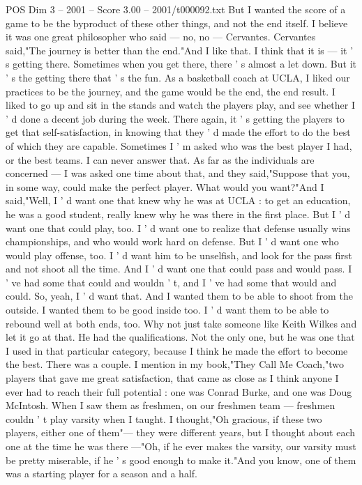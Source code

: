 \begin{textsample}{POS Dim 3 – 2001 – Score 3.00 – 2001/t000092.txt}
But I wanted the score of a game to be the byproduct of these other things, and not the end itself.
I believe it was one great philosopher who said — no, no — Cervantes.
Cervantes said,"The journey is better than the end."And I like that.
I think that it is — it ' s getting there.
Sometimes when you get there, there ' s almost a let down.
But it ' s the getting there that ' s the fun.
As a basketball coach at UCLA, I liked our practices to be the journey, and the game would be the end, the end result.
I liked to go up and sit in the stands and watch the players play, and see whether I ' d done a decent job during the week.
There again, it ' s getting the players to get that self-satisfaction, in knowing that they ' d made the effort to do the best of which they are capable.
Sometimes I ' m asked who was the best player I had, or the best teams.
I can never answer that.
As far as the individuals are concerned — I was asked one time about that, and they said,"Suppose that you, in some way, could make the perfect player.
What would you want?"And I said,"Well, I ' d want one that knew why he was at UCLA : to get an education, he was a good student, really knew why he was there in the first place.
But I ' d want one that could play, too.
I ' d want one to realize that defense usually wins championships, and who would work hard on defense.
But I ' d want one who would play offense, too.
I ' d want him to be unselfish, and look for the pass first and not shoot all the time.
And I ' d want one that could pass and would pass.
I ' ve had some that could and wouldn ' t, and I ' ve had some that would and could.
So, yeah, I ' d want that.
And I wanted them to be able to shoot from the outside.
I wanted them to be good inside too.
I ' d want them to be able to rebound well at both ends, too.
Why not just take someone like Keith Wilkes and let it go at that.
He had the qualifications.
Not the only one, but he was one that I used in that particular category, because I think he made the effort to become the best.
There was a couple.
I mention in my book,"They Call Me Coach,"two players that gave me great satisfaction, that came as close as I think anyone I ever had to reach their full potential : one was Conrad Burke, and one was Doug McIntosh.
When I saw them as freshmen, on our freshmen team — freshmen couldn ' t play varsity when I taught.
I thought,"Oh gracious, if these two players, either one of them"— they were different years, but I thought about each one at the time he was there —"Oh, if he ever makes the varsity, our varsity must be pretty miserable, if he ' s good enough to make it."And you know, one of them was a starting player for a season and a half.

\end{textsample}
